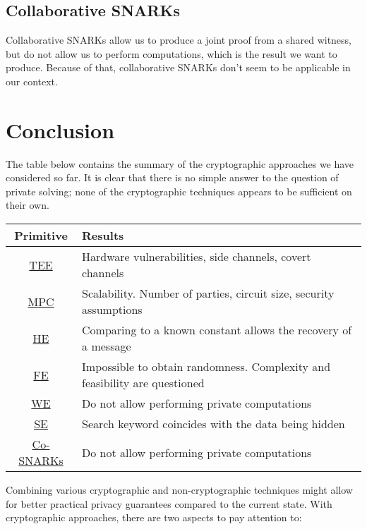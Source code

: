 \documentclass[
    9pt,            %
    report,        %
    affiltop,       %
]{art}
\begin{document}
\subsection{Collaborative SNARKs}\label{co-SNARKs-expanded}

Collaborative SNARKs allow us to produce a joint proof from a shared witness, but do not allow us to perform computations, which is the result we want to produce. Because of that, collaborative SNARKs don't seem to be applicable in our context.

\section{Conclusion}\label{conclusion}

The table below contains the summary of the cryptographic approaches we have considered so far. It is clear that there is no simple answer to the question of private solving; none of the cryptographic techniques appears to be sufficient on their own.

\begin{center}
\begin{tabular}{ cl } 
\toprule
 Primitive & Results \\
\midrule
\hyperref[TEE]{TEE} & Hardware vulnerabilities, side channels, covert channels \\ 
\midrule
\hyperref[MPC]{MPC} & Scalability. Number of parties, circuit size, security assumptions \\ 
\midrule
\hyperref[HE]{HE}& Comparing to a known constant allows the recovery of a message\\ 
\midrule
\hyperref[FE]{FE}& Impossible to obtain randomness. Complexity and feasibility are questioned \\ 
\midrule
\hyperref[WE]{WE}& Do not allow performing private computations \\ 
\midrule
\hyperref[SE]{SE}& Search keyword coincides with the data being hidden\\ 
\midrule
\hyperref[CoSNARKs]{Co-SNARKs} & Do not allow performing private computations \\ 
\bottomrule
\end{tabular}
\end{center}

Combining various cryptographic and non-cryptographic techniques might allow for better practical privacy guarantees compared to the current state. With cryptographic approaches, there are two aspects to pay attention to:
\end{document}
